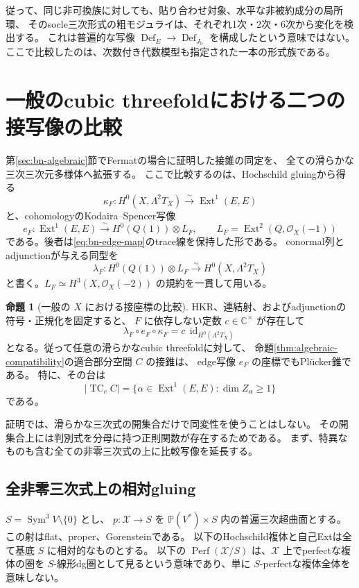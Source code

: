 \documentclass[a4paper,11pt]{ltjsarticle}
\theoremstyle{definition}
\newtheorem{theorem}{命題}[section]
\newcommand{\CC}{\mathbb C}
\newcommand{\OO}{\mathcal O}
\newcommand{\PP}{\mathbb P}
\newcommand{\Def}{\operatorname{Def}}
\newcommand{\Sym}{\operatorname{Sym}}
\newcommand{\Ext}{\operatorname{Ext}}
\newcommand{\Perf}{\operatorname{Perf}}
\newcommand{\id}{\operatorname{id}}
\begin{document}
従って、同じ非可換族に対しても、貼り合わせ対象、水平な非被約成分の局所環、
そのsocle三次形式の粗モジュライは、それぞれ1次・2次・6次から変化を検出する。
これは普遍的な写像 $\Def_E\to\operatorname{Def}_{J_0}$ を構成したという意味ではない。
ここで比較したのは、次数付き代数模型も指定された一本の形式族である。

\section{一般のcubic threefoldにおける二つの接写像の比較}
\label{sec:general-tangent-comparison}

第\ref{sec:bn-algebraic}節でFermatの場合に証明した接錐の同定を、
全ての滑らかな三次三次元多様体へ拡張する。
ここで比較するのは、Hochschild gluingから得る
\[
 \kappa_F:H^0(X,\Lambda^2T_X)\xrightarrow{\sim}\Ext^1(E,E)
\]
と、cohomologyのKodaira--Spencer写像
\[
 e_F:\Ext^1(E,E)\xrightarrow{\sim}H^0(Q(1))\otimes L_F,
 \qquad L_F=\Ext^2(Q,\OO_X(-1))
\]
である。後者は\eqref{eq:bn-edge-map}のtrace線を保持した形である。
conormal列とadjunctionが与える同型を
\[
 \lambda_F:H^0(Q(1))\otimes L_F
       \xrightarrow{\sim}H^0(X,\Lambda^2T_X)
\]
と書く。$L_F\simeq H^3(X,\OO_X(-2))$ の規約を一貫して用いる。

\begin{theorem}[一般の $X$ における接座標の比較]
\label{thm:general-tangent-comparison}
HKR、連結射、およびadjunctionの符号・正規化を固定すると、
$F$ に依存しない定数 $c\in\CC^\times$ が存在して
\[
               \lambda_F\circ e_F\circ\kappa_F
                    =c\,\id_{H^0(\Lambda^2T_X)}
\]
となる。従って任意の滑らかなcubic threefoldに対して、
命題\ref{thm:algebraic-compatibility}の適合部分空間 $C$ の接錐は、
edge写像 $e_F$ の座標でもPl\"ucker錐である。
特に、その台は
\[
 |\operatorname{TC}_cC|
 =\{\alpha\in\Ext^1(E,E):\dim Z_\alpha\ge1\}
\]
である。
\end{theorem}

証明では、滑らかな三次式の開集合だけで同変性を使うことはしない。
その開集合上には判別式を分母に持つ正則関数が存在するためである。
まず、特異なものも含む全ての非零三次式の上に比較写像を延長する。

\subsection{全非零三次式上の相対gluing}

$S=\Sym^3V\setminus\{0\}$ とし、
$p:\mathcal X\to S$ を $\PP(V^*)\times S$ 内の普遍三次超曲面とする。
この射はflat、proper、Gorensteinである。
以下のHochschild複体と自己Extは全て基底 $S$ に相対的なものとする。
以下の $\Perf(\mathcal X/S)$ は、$\mathcal X$ 上でperfectな複体の圏を
$S$-線形dg圏として見るという意味であり、単に $S$-perfectな複体全体を意味しない。
\end{document}
